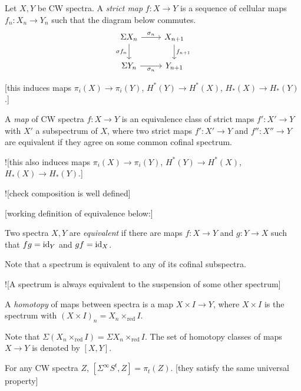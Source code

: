 \documentclass{MetricNotes2023}
\def\SIgma{\ensuremath\Sigma}
\def\id{\ensuremath\text{id}}
\begin{document}
\begin{definition}
Let \(X, Y\) be CW spectra. A \textit{strict map} \(f : X \to Y\) is a sequence of cellular maps \(f_n : X_n \to Y_n\) such that the diagram below commutes.
\[\begin{tikzcd}
\Sigma X_n \arrow[r, "\sigma_n"] \arrow[d, swap, "\sigma f_n"]  & X_{n+1} \arrow[d, "f_{n+1}"]  \\
\SIgma Y_n \arrow[r, swap, "\sigma_n"]  & Y_{n+1}
\end{tikzcd}\]
\end{definition}

[this induces maps \(\pi_i(X)\to\pi_i(Y)\), \(H^*(Y)\to H^*(X)\), \(H_*(X)\to H_*(Y)\).]

\begin{definition}
A \textit{map} of CW spectra \(f : X \to Y\) is an equivalence class of strict maps \(f' : X' \to Y\) with \(X'\) a subspectrum of \(X\), where two strict maps \(f' : X' \to Y\) and \(f'' : X'' \to Y\) are equivalent if they agree on some common cofinal spectrum. 
\end{definition}

![this also induces maps \(\pi_i(X)\to\pi_i(Y)\), \(H^*(Y)\to H^*(X)\), \(H_*(X)\to H_*(Y)\).]

![check composition is well defined]

[working definition of equivalence below:]

\begin{definition}
Two spectra \(X, Y\) are \textit{equivalent} if there are maps \(f : X \to Y\) and \(g : Y \to X\) such that \(fg=\id_{Y}\) and \(gf=\id_X\).
\end{definition}

Note that a spectrum is equivalent to any of its cofinal subspectra.

![A spectrum is always equivalent to the suspension of some other spectrum]

\begin{definition}
A \textit{homotopy} of maps between spectra is a map \(X\times I \to Y\), where \(X\times I\) is the spectrum with \((X\times I)_n=X_n\times_{\text{red}} I\).
\end{definition}

Note that \(\Sigma(X_n\times_{\text{red}}I)=\Sigma X_n\times_{\text{red}}I\). The set of homotopy classes of maps \(X\to Y\) is denoted by \([X,Y]\). 

\begin{remark}
For any CW spectra \(Z\), \([\Sigma^\infty S^t, Z]=\pi_t(Z)\). [they satisfy the same universal property]
\end{remark}
\end{document}
